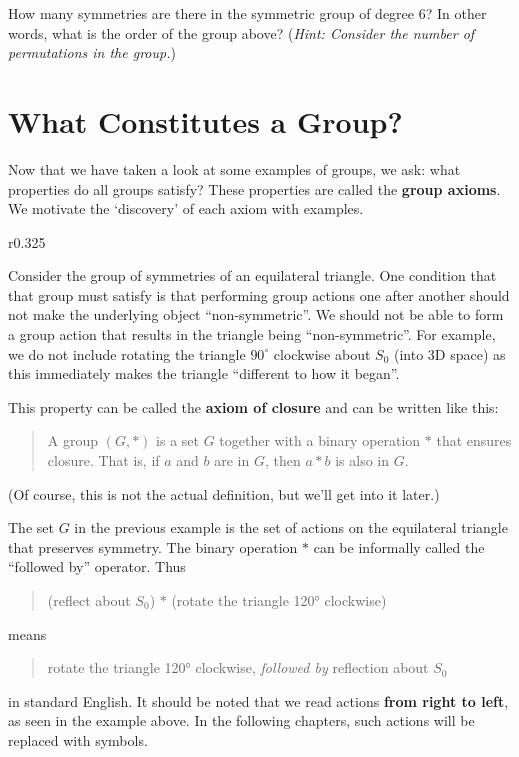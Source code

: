 \begin{exercise}
    How many symmetries are there in the symmetric group of degree 6? In other words, what is the order of the group above?\newline
    (\textit{Hint: Consider the number of permutations in the group.})
\end{exercise}

\section{What Constitutes a Group?}
Now that we have taken a look at some examples of groups, we ask: what properties do all groups satisfy? These properties are called the \textbf{group axioms}. We motivate the `discovery' of each axiom with examples.

\begin{wrapfigure}{r}{0.325\textwidth}
    \centering
\end{wrapfigure}

Consider the group of symmetries of an equilateral triangle. One condition that that group must satisfy is that performing group actions one after another should not make the underlying object ``non-symmetric''. We should not be able to form a group action that results in the triangle being ``non-symmetric''. For example, we do not include rotating the triangle $90^\circ$ clockwise about $S_0$ (into 3D space) as this immediately makes the triangle ``different to how it began''.

\newpage

This property can be called the \textbf{axiom of closure} and can be written like this:
\begin{quote}
    A group $(G, \ast)$ is a set $G$ together with a binary operation $\ast$ that ensures closure. That is, if $a$ and $b$ are in $G$, then $a \ast b$ is also in $G$.
\end{quote}
(Of course, this is not the actual definition, but we'll get into it later.)

The set $G$ in the previous example is the set of actions on the equilateral triangle that preserves symmetry. The binary operation $\ast$ can be informally called the ``followed by'' operator. Thus
\begin{quote}
    (reflect about $S_0$) $\ast$ (rotate the triangle 120° clockwise)
\end{quote}
means
\begin{quote}
    rotate the triangle 120° clockwise, \textit{followed by} reflection about $S_0$
\end{quote}
in standard English. It should be noted that we read actions \textbf{from right to left}, as seen in the example above. In the following chapters, such actions will be replaced with symbols.

